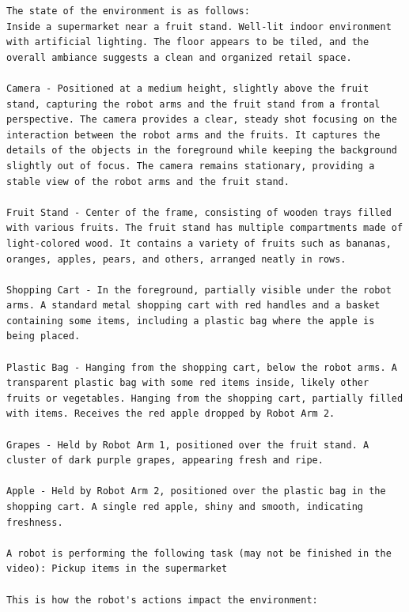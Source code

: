 \begin{tcolorbox}[colback=nvidiagreen!3,colframe=nvidiagreen!75!white,title=\textsc{AgiBot Reasoning Extraction Prompt},left=0.5ex,right=0.5ex,top=0.5ex,bottom=0.5ex]
\fontsize{9.}{9.}\selectfont
\begin{Verbatim}[breaklines=true, breaksymbolleft={}, breaksymbolright={}]
The state of the environment is as follows:
Inside a supermarket near a fruit stand. Well-lit indoor environment with artificial lighting. The floor appears to be tiled, and the overall ambiance suggests a clean and organized retail space. 

Camera - Positioned at a medium height, slightly above the fruit stand, capturing the robot arms and the fruit stand from a frontal perspective. The camera provides a clear, steady shot focusing on the interaction between the robot arms and the fruits. It captures the details of the objects in the foreground while keeping the background slightly out of focus. The camera remains stationary, providing a stable view of the robot arms and the fruit stand. 

Fruit Stand - Center of the frame, consisting of wooden trays filled with various fruits. The fruit stand has multiple compartments made of light-colored wood. It contains a variety of fruits such as bananas, oranges, apples, pears, and others, arranged neatly in rows. 

Shopping Cart - In the foreground, partially visible under the robot arms. A standard metal shopping cart with red handles and a basket containing some items, including a plastic bag where the apple is being placed. 

Plastic Bag - Hanging from the shopping cart, below the robot arms. A transparent plastic bag with some red items inside, likely other fruits or vegetables. Hanging from the shopping cart, partially filled with items. Receives the red apple dropped by Robot Arm 2. 

Grapes - Held by Robot Arm 1, positioned over the fruit stand. A cluster of dark purple grapes, appearing fresh and ripe. 

Apple - Held by Robot Arm 2, positioned over the plastic bag in the shopping cart. A single red apple, shiny and smooth, indicating freshness.

A robot is performing the following task (may not be finished in the video): Pickup items in the supermarket

This is how the robot's actions impact the environment:


\end{Verbatim}
\end{tcolorbox}
